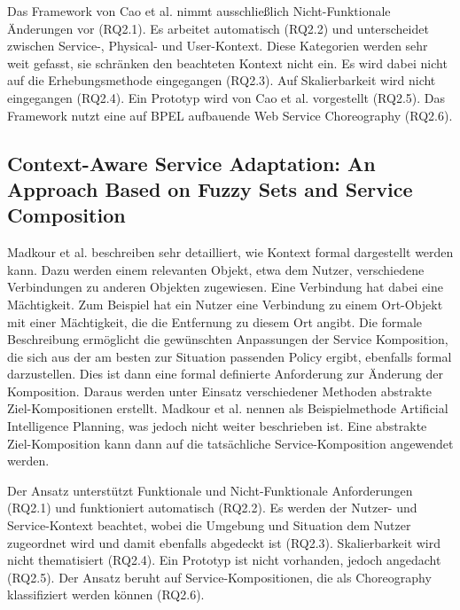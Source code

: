 \documentclass[conference,compsoc,ngerman]{IEEEtran}
\begin{document}
Das Framework von Cao et al. \cite{CZZ15} nimmt ausschließlich Nicht-Funktionale Änderungen vor (RQ2.1). Es arbeitet automatisch (RQ2.2) und unterscheidet zwischen Service-, Physical- und User-Kontext. Diese Kategorien werden sehr weit gefasst, sie schränken den beachteten Kontext nicht ein. Es wird dabei nicht auf die Erhebungsmethode eingegangen (RQ2.3). Auf Skalierbarkeit wird nicht eingegangen (RQ2.4). Ein Prototyp wird von Cao et al. \cite{CZZ15} vorgestellt (RQ2.5). Das Framework nutzt eine auf BPEL aufbauende Web Service Choreography (RQ2.6).

\subsection{Context-Aware Service Adaptation: An Approach Based on Fuzzy Sets and Service Composition}
Madkour et al. \cite{MEM13} beschreiben sehr detailliert, wie Kontext formal dargestellt werden kann. Dazu werden einem relevanten Objekt, etwa dem Nutzer, verschiedene Verbindungen zu anderen Objekten zugewiesen. Eine Verbindung hat dabei eine Mächtigkeit. Zum Beispiel hat ein Nutzer eine Verbindung zu einem Ort-Objekt mit einer Mächtigkeit, die die Entfernung zu diesem Ort angibt. Die formale Beschreibung ermöglicht die gewünschten Anpassungen der Service Komposition, die sich aus der am besten zur Situation passenden Policy ergibt, ebenfalls formal darzustellen. Dies ist dann eine formal definierte Anforderung zur Änderung der Komposition. Daraus werden unter Einsatz verschiedener Methoden abstrakte Ziel-Kompositionen erstellt. Madkour et al. \cite{MEM13} nennen als Beispielmethode Artificial Intelligence Planning, was jedoch nicht weiter beschrieben ist. Eine abstrakte Ziel-Komposition kann dann auf die tatsächliche Service-Komposition angewendet werden.

Der Ansatz unterstützt Funktionale und Nicht-Funktionale Anforderungen (RQ2.1) und funktioniert automatisch (RQ2.2). Es werden der Nutzer- und Service-Kontext beachtet, wobei die Umgebung und Situation dem Nutzer zugeordnet wird und damit ebenfalls abgedeckt ist (RQ2.3). Skalierbarkeit wird nicht thematisiert (RQ2.4). Ein Prototyp ist nicht vorhanden, jedoch angedacht (RQ2.5). Der Ansatz beruht auf Service-Kompositionen, die als Choreography klassifiziert werden können (RQ2.6).
\end{document}
